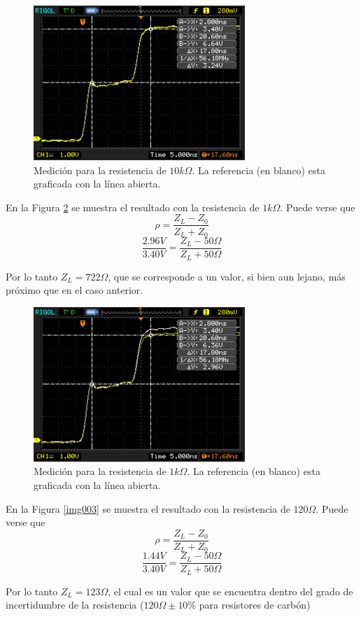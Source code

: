 \documentclass[a4paper,10pt]{article}
\begin{document}
		\begin{figure}[!htb]
			\centering
			\includegraphics[width=8cm]
			{Imagenes/Res10k.png}
			\caption{Medici\'on para la resistencia de $10k\Omega$. La 
			referencia (en blanco) esta graficada con la l\'inea abierta.}
			\label{img001} 
		\end{figure}

	\indent En la Figura \ref{img002} se muestra el resultado con la 
	resistencia de $1k\Omega$. Puede verse que 
	$$\rho=\frac{Z_L-Z_0}{Z_L+Z_0}$$
	$$\frac{2.96V}{3.40V}=\frac{Z_L- 50\Omega}{Z_L+50\Omega}$$
	
	\indent Por lo tanto $Z_L=722\Omega$, que se corresponde a un valor, si 
	bien aun lejano, m\'as pr\'oximo que en el caso anterior.
		
		\begin{figure}[!htb]
			\centering
			\includegraphics[width=8cm]
			{Imagenes/Res1k.png}
			\caption{Medici\'on para la resistencia de $1k\Omega$. La 
			referencia (en blanco) esta graficada con la l\'inea abierta.}
			\label{img002} 
		\end{figure}

	\indent En la Figura \ref{img003} se muestra el resultado con la 
	resistencia de $120\Omega$. Puede verse que 
	$$\rho=\frac{Z_L-Z_0}{Z_L+Z_0}$$
	$$\frac{1.44V}{3.40V}=\frac{Z_L- 50\Omega}{Z_L+50\Omega}$$
	
	\indent Por lo tanto $Z_L=123\Omega$, el cual es un valor que se encuentra
	dentro del grado de incertidumbre de la resistencia ($120\Omega \pm 10\%$
	para resistores de carb\'on)	
\end{document}
